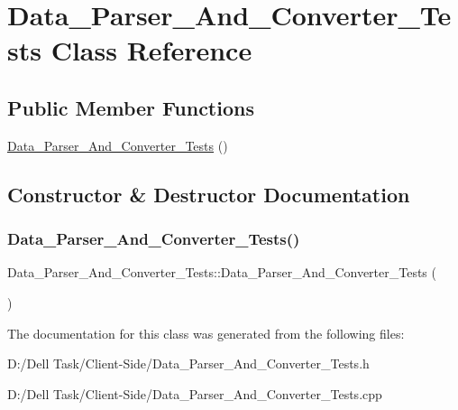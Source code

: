 \hypertarget{class_data___parser___and___converter___tests}{}\section{Data\+\_\+\+Parser\+\_\+\+And\+\_\+\+Converter\+\_\+\+Tests Class Reference}
\label{class_data___parser___and___converter___tests}
\subsection*{Public Member Functions}
\begin{DoxyCompactItemize}
\item 
\mbox{\hyperlink{class_data___parser___and___converter___tests_a5232fa557f4d9a801ced25b73f2d982f}{Data\+\_\+\+Parser\+\_\+\+And\+\_\+\+Converter\+\_\+\+Tests}} ()
\end{DoxyCompactItemize}


\subsection{Constructor \& Destructor Documentation}
\mbox{\label{class_data___parser___and___converter___tests_a5232fa557f4d9a801ced25b73f2d982f}} 
\subsubsection{\texorpdfstring{Data\+\_\+\+Parser\+\_\+\+And\+\_\+\+Converter\+\_\+\+Tests()}{Data\_Parser\_And\_Converter\_Tests()}}
{\footnotesize\ttfamily Data\+\_\+\+Parser\+\_\+\+And\+\_\+\+Converter\+\_\+\+Tests\+::\+Data\+\_\+\+Parser\+\_\+\+And\+\_\+\+Converter\+\_\+\+Tests (\begin{DoxyParamCaption}{ }\end{DoxyParamCaption})}







The documentation for this class was generated from the following files\+:\begin{DoxyCompactItemize}
\item 
D\+:/\+Dell Task/\+Client-\/\+Side/Data\+\_\+\+Parser\+\_\+\+And\+\_\+\+Converter\+\_\+\+Tests.\+h\item 
D\+:/\+Dell Task/\+Client-\/\+Side/Data\+\_\+\+Parser\+\_\+\+And\+\_\+\+Converter\+\_\+\+Tests.\+cpp\end{DoxyCompactItemize}
